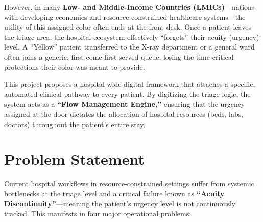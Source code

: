 \documentclass[12pt, a4paper]{article}
\begin{document}
	However, in many \textbf{Low- and Middle-Income Countries (LMICs)}---nations with developing economies and resource-constrained healthcare systems---the utility of this assigned color often ends at the front desk. Once a patient leaves the triage area, the hospital ecosystem effectively ``forgets'' their acuity (urgency) level. A ``Yellow'' patient transferred to the X-ray department or a general ward often joins a generic, first-come-first-served queue, losing the time-critical protections their color was meant to provide. 
	
	This project proposes a hospital-wide digital framework that attaches a specific, automated clinical pathway to every patient. By digitizing the triage logic, the system acts as a \textbf{``Flow Management Engine,''} ensuring that the urgency assigned at the door dictates the allocation of hospital resources (beds, labs, doctors) throughout the patient's entire stay.
	
	\section{Problem Statement}
	Current hospital workflows in resource-constrained settings suffer from systemic bottlenecks at the triage level and a critical failure known as \textbf{``Acuity Discontinuity''}---meaning the patient's urgency level is not continuously tracked. This manifests in four major operational problems:
	
\end{document}
